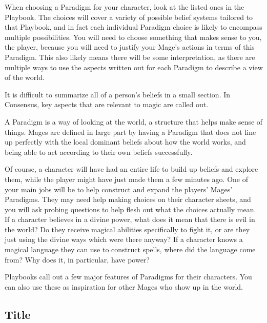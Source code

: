 \documentclass[
  oneside,
  statementpaper,
  9pt]{memoir}
\begin{document}
\begin{Player}
When choosing a Paradigm for your character, look at the listed ones in the Playbook. The choices will cover a variety of possible belief systems tailored to that Playbook, and in fact each individual Paradigm choice is likely to encompass multiple possibilities. You will need to choose something that makes sense to you, the player, because you will need to justify your Mage’s actions in terms of this Paradigm. This also likely means there will be some interpretation, as there are multiple ways to use the aspects written out for each Paradigm to describe a view of the world.

It is difficult to summarize all of a person’s beliefs in a small section. In Consensus, key aspects that are relevant to magic are called out.

\end{Player}

\begin{MC}

A Paradigm is a way of looking at the world, a structure that helps make sense of things. Mages are defined in large part by having a Paradigm that does not line up perfectly with the local dominant beliefs about how the world works, and being able to act according to their own beliefs successfully.

Of course, a character will have had an entire life to build up beliefs and explore them, while the player might have just made them a few minutes ago. One of your main jobs will be to help construct and expand the players' Mages' Paradigms. They may need help making choices on their character sheets, and you will ask probing questions to help flesh out what the choices actually mean. If a character believes in a divine power, what does it mean that there is evil in the world? Do they receive magical abilities specifically to fight it, or are they just using the divine ways which were there anyway? If a character knows a magical language they can use to construct spells, where did the language come from? Why does it, in particular, have power?

Playbooks call out a few major features of Paradigms for their characters. You can also use these as inspiration for other Mages who show up in the world.

\end{MC}

\hypertarget{title}{%
\subsection{Title}\label{title}}
\end{document}
